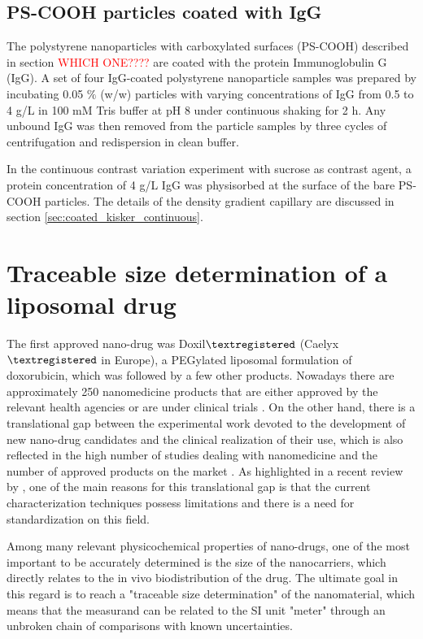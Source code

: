 \subsection{PS-COOH particles coated with IgG}

The polystyrene nanoparticles with carboxylated surfaces (PS-COOH) described in section \textcolor{red}{WHICH ONE????} are coated with the protein Immunoglobulin G (IgG). A set of four IgG-coated polystyrene nanoparticle samples was prepared by incubating 0.05 $\%$ (w/w) particles with varying concentrations of IgG from 0.5 to 4 g/L in 100 mM Tris buffer at pH 8 under continuous shaking for 2 h. Any unbound IgG was then removed from the particle samples by three cycles of centrifugation and redispersion in clean buffer. 

In the continuous contrast variation experiment with sucrose as contrast agent, a protein concentration of 4 g/L IgG was physisorbed at the surface of the bare PS-COOH particles. The details of the density gradient capillary are discussed in section \ref{sec:coated_kisker_continuous}.


\section{Traceable size determination of a liposomal drug}
\label{sec:caelyx_size}

The first approved nano-drug was Doxil$\textregistered$ (Caelyx$\textregistered$ in Europe), a PEGylated liposomal formulation of doxorubicin, which was followed by a few other products\cite{yeh_clinical_2011,barenholz_doxil_2012}. Nowadays there are approximately 250 nanomedicine products that are either approved by the relevant health agencies or are under clinical trials \cite{etheridge_big_2013}. On the other hand, there is a translational gap between the experimental work devoted to the development of new nano-drug candidates and the clinical realization of their use, which is also reflected in the high number of studies dealing with nanomedicine and the number of approved products on the market \cite{khorasani_closing_2014, venditto_cancer_2013}. As highlighted in a recent review by \cite{khorasani_closing_2014}, one of the main reasons for this translational gap is that the current characterization techniques possess limitations and there is a need for standardization on this field.

Among many relevant physicochemical properties of nano-drugs, one of the most important to be accurately determined is the size of the nanocarriers, which directly relates to the in vivo biodistribution of the drug. The ultimate goal in this regard is to reach a "traceable size determination" of the nanomaterial, which means that the measurand can be related to the SI unit "meter" through an unbroken chain of comparisons with known uncertainties. 

